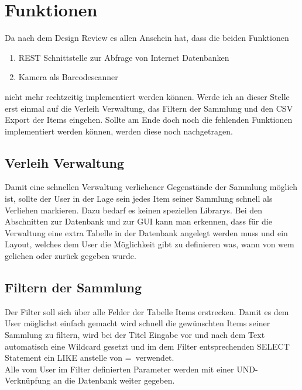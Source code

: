 \section{Funktionen}

Da nach dem Design Review es allen Anschein hat, dass die beiden Funktionen 

\begin{enumerate}
	\item REST Schnittstelle zur Abfrage von Internet Datenbanken
	\item Kamera als Barcodescanner
\end{enumerate}

nicht mehr rechtzeitig implementiert werden können. Werde ich an dieser Stelle erst einmal auf die Verleih Verwaltung, das Filtern der Sammlung und den CSV Export der Items eingehen. Sollte am Ende doch noch die fehlenden Funktionen implementiert werden können, werden diese noch nachgetragen.

\subsection{Verleih Verwaltung}

Damit eine schnellen Verwaltung verliehener Gegenstände der Sammlung möglich ist, sollte der User in der Lage sein jedes Item seiner Sammlung schnell als Verliehen markieren. Dazu bedarf es keinen speziellen Librarys. Bei den Abschnitten zur Datenbank und zur GUI kann man erkennen, dass für die Verwaltung eine extra Tabelle in der Datenbank angelegt werden muss und ein Layout, welches dem User die Möglichkeit gibt zu definieren was, wann von wem geliehen oder zurück gegeben wurde. 

\subsection{Filtern der Sammlung}

Der Filter soll sich über alle Felder der Tabelle Items erstrecken. Damit es dem User möglichst einfach gemacht wird schnell die gewünschten Items seiner Sammlung zu filtern, wird bei der Titel Eingabe vor und nach dem Text automatisch eine Wildcard gesetzt und im dem Filter entsprechenden SELECT Statement ein LIKE anstelle von \glqq=\grqq \ verwendet.\\

Alle vom User im Filter definierten Parameter werden mit einer UND-Verknüpfung an die Datenbank weiter gegeben.\\

